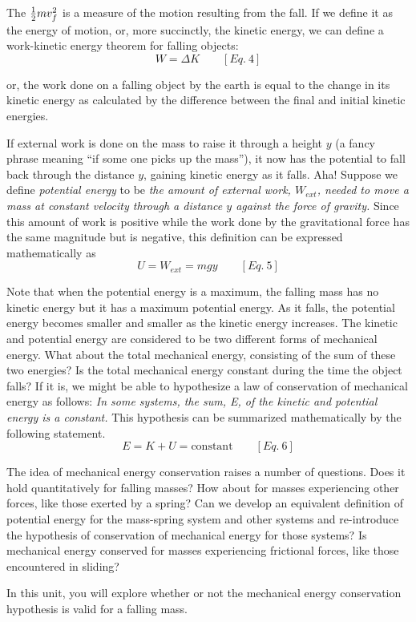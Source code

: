 The \({1\over 2}mv_{f}^{2} \) is a measure of the motion resulting from the fall.
If we define it as the energy of motion, or, more succinctly, the kinetic 
energy, we can define a work-kinetic energy theorem for falling objects:
\[
W=\Delta K\qquad [Eq.\: 4]\]


or, the work done on a falling object by the earth is equal to the change in
its kinetic energy as calculated by the difference between the final and initial
kinetic energies.

If external work is done on the mass to raise it through a height $y$ (a fancy
phrase meaning ``if some one picks up the mass''), it now has
the potential to fall back through the distance $y$, gaining kinetic energy as
it falls. Aha! Suppose we define \textit{potential energy} to be \textit{the
amount of external work, \( W_{ext} \), needed to move a mass at constant velocity
through a distance $y$ against the force of gravity.} Since this amount of work
is positive while the work done by the gravitational force has the same magnitude
but is negative, this definition can be expressed mathematically as
\[
U=W_{ext}=mgy\qquad [Eq.\: 5]\]


Note that when the potential energy is a maximum, the falling mass has no kinetic
energy but it has a maximum potential energy. As it falls, the potential energy
becomes smaller and smaller as the kinetic energy increases. The kinetic and
potential energy are considered to be two different forms of mechanical energy.
What about the total mechanical energy, consisting of the sum of these two energies?
Is the total mechanical energy constant during the time the object falls? If
it is, we might be able to hypothesize a law of conservation of mechanical energy
as follows: \textit{In some systems, the sum, E, of the kinetic and potential
energy is a constant.} This hypothesis can be summarized mathematically by the
following statement.
\[
E=K+U=\mbox{constant}\qquad [Eq.\: 6]\]


The idea of mechanical energy conservation raises a number of questions. Does
it hold quantitatively for falling masses? How about for masses experiencing
other forces, like those exerted by a spring? Can we develop an equivalent definition
of potential energy for the mass-spring system and other systems and re-introduce
the hypothesis of conservation of mechanical energy for those systems? Is mechanical
energy conserved for masses experiencing frictional forces, like those encountered
in sliding?

In this unit, you will explore whether or not the mechanical energy conservation
hypothesis is valid for a falling mass.

